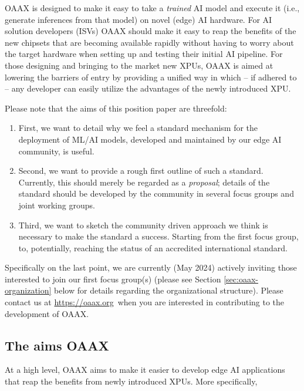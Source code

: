 \documentclass{article}
\newcommand{\oaaxweb}{\href{https://oaax.org}{https://oaax.org}}
\begin{document}
OAAX is designed to make it easy to take a \emph{trained} AI model and execute it (i.e., generate inferences from that model) on novel (edge) AI hardware. For AI solution developers (ISVs) OAAX should make it easy to reap the benefits of the new chipsets that are becoming available rapidly without having to worry about the target hardware when setting up and testing their initial AI pipeline. For those designing and bringing to the market new XPUs, OAAX is aimed at lowering the barriers of entry by providing a unified way in which -- if adhered to -- any developer can easily utilize the advantages of the newly introduced XPU.

Please note that the aims of this position paper are threefold:
\begin{enumerate}
\item First, we want to detail why we feel a standard mechanism for the deployment of ML/AI models, developed and maintained by our edge AI community, is useful.
\item Second, we want to provide a rough first outline of such a standard. Currently, this should merely be regarded as a \emph{proposal}; details of the standard should be developed by the community in several focus groups and joint working groups.
\item Third, we want to sketch the community driven approach we think is necessary to make the standard a success. Starting from the first focus group, to, potentially, reaching the status of an accredited international standard.
\end{enumerate}
Specifically on the last point, we are currently (May 2024) actively inviting those interested to join our first focus group(s) (please see Section \ref{sec:oaax-organization} below for details regarding the organizational structure). Please contact us at \oaaxweb ~when you are interested in contributing to the development of OAAX.

\subsection{The aims OAAX}

At a high level, OAAX aims to make it easier to develop edge AI applications that reap the benefits from newly introduced XPUs. More specifically,
\end{document}
